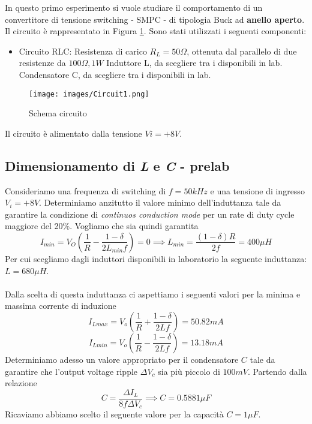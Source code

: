 In questo primo esperimento si vuole studiare il comportamento di un convertitore di tensione switching - SMPC - di tipologia Buck ad \textbf{anello aperto}. Il circuito è rappresentato in Figura \ref{fig:Circuit1}. Sono stati utilizzati i seguenti componenti:
\begin{itemize}
    \item Circuito RLC:
    \subitem Resistenza di carico $R_L=50\Omega$, ottenuta dal parallelo di due resistenze da $100\Omega,1W$
    \subitem Induttore L, da scegliere tra i disponibili in lab.
    \subitem Condensatore C, da scegliere tra i disponibili in lab.
\end{itemize}
\begin{figure}[H]
    \centering
    \texttt{[image: images/Circuit1.png]}
    \caption{Schema circuito}
    \label{fig:Circuit1}
\end{figure}
Il circuito è alimentato dalla tensione $Vi=+8V$.
\subsection{Dimensionamento di \textit{L} e \textit{C} - prelab}\label{ch:Cap1}
Consideriamo una frequenza di switching di $f=50kHz$ e una tensione di ingresso $V_i=+8V$. Determiniamo anzitutto il valore minimo dell'induttanza tale da garantire la condizione di \textit{continuos conduction mode} per un rate di duty cycle maggiore del 20\%. Vogliamo che sia quindi garantita
\begin{equation}
    I_{min}=V_O\left(\frac{1}{R}-\frac{1-\delta}{2L_{min}f}\right)=0\implies L_{min}=\frac{(1-\delta)R}{2f}=400\mu H
\end{equation}
Per cui scegliamo dagli induttori disponibili in laboratorio la seguente induttanza: $L=680\mu H$.\\\\
Dalla scelta di questa induttanza ci aspettiamo i seguenti valori per la minima e massima corrente di induzione
\begin{equation}
    I_{Lmax}=V_o\left(\frac{1}{R}+\frac{1-\delta}{2Lf}\right)=50.82mA
\end{equation}
\begin{equation}
    I_{Lmin}=V_o\left(\frac{1}{R}-\frac{1-\delta}{2Lf}\right)=13.18mA
\end{equation}
Determiniamo adesso un valore appropriato per il condensatore $C$ tale da garantire che l'output voltage ripple $\Delta V_c$ sia più piccolo di $100mV$. Partendo dalla relazione
\begin{equation}
    C=\frac{\Delta I_L}{8f\Delta V_c}\implies C=0.5881\mu F
\end{equation}
Ricaviamo abbiamo scelto il seguente valore per la capacità $C=1\mu F$.






